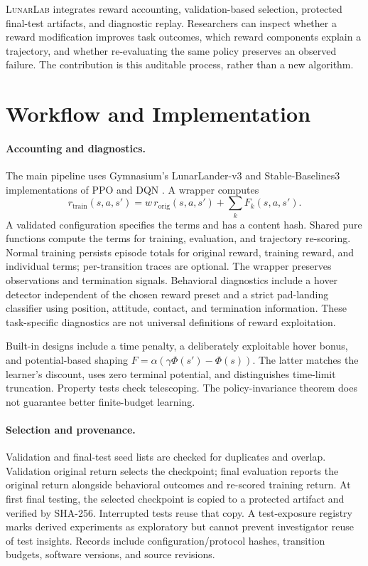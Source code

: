 \documentclass[twoside,11pt]{article}
\newcommand{\lunarlab}{\textsc{LunarLab}}
\begin{document}
\lunarlab{} integrates reward accounting, validation-based selection, protected final-test artifacts, and
diagnostic replay. Researchers can inspect whether a reward modification improves task outcomes, which reward
components explain a trajectory, and whether re-evaluating the same policy preserves an observed failure.
The contribution is this auditable process, rather than a new algorithm.

\section{Workflow and Implementation}
\paragraph{Accounting and diagnostics.} The main pipeline uses Gymnasium's LunarLander-v3
\citep{towers2024gymnasium} and Stable-Baselines3 implementations of PPO and DQN \citep{raffin2021sb3}.
A wrapper computes
\[
 r_{\mathrm{train}}(s,a,s')=w\,r_{\mathrm{orig}}(s,a,s')+\sum_k F_k(s,a,s').
\]
A validated configuration specifies the terms and has a content hash. Shared pure functions compute the
terms for training, evaluation, and trajectory re-scoring. Normal training persists episode totals for
original reward, training reward, and individual terms; per-transition traces are optional. The wrapper
preserves observations and termination signals. Behavioral diagnostics include a hover detector independent
of the chosen reward preset and a strict pad-landing classifier using position, attitude, contact, and
termination information. These task-specific diagnostics are not universal definitions of reward exploitation.

Built-in designs include a time penalty, a deliberately exploitable hover bonus, and potential-based shaping
$F=\alpha(\gamma\Phi(s')-\Phi(s))$. The latter matches the learner's discount, uses zero terminal potential, and distinguishes time-limit
truncation. Property tests check telescoping. The policy-invariance theorem \citep{ng1999shaping} does not
guarantee better finite-budget learning.

\paragraph{Selection and provenance.} Validation and final-test seed lists are checked for duplicates and
overlap. Validation original return selects the checkpoint; final evaluation reports the original return
alongside behavioral outcomes and re-scored training return. At first final testing, the selected checkpoint
is copied to a protected artifact and verified by SHA-256. Interrupted tests reuse that copy. A test-exposure registry marks derived experiments as exploratory but cannot prevent investigator reuse of
test insights. Records include configuration/protocol hashes, transition budgets, software versions, and source revisions.
\end{document}
